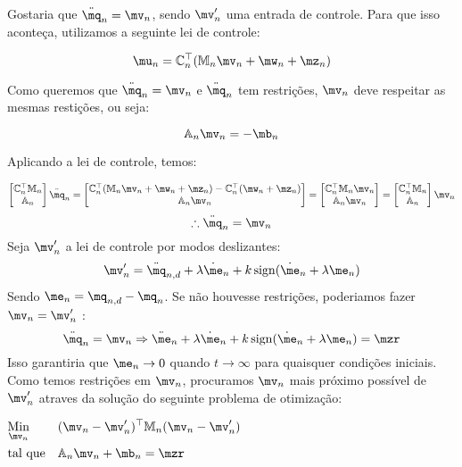 Gostaria que $ \ddot{\mq}_n = \mv_n $, sendo $\mv'_n$ uma entrada de controle. Para que isso aconte\c{c}a, utilizamos a seguinte lei de controle:

$$ \mu_n = \mC_n^\top ( \mM_n \mv_n + \mw_n + \mz_n ) $$

Como queremos que $ \ddot{\mq}_n = \mv_n $ e $\ddot{\mq}_n$ tem restri\c{c}\~oes, $\mv_n$ deve respeitar as mesmas resti\c{c}\~oes, ou seja:

$$ \mA_n \mv_n = -\mb_n $$

Aplicando a lei de controle, temos:

$$
\begin{bmatrix}
\mC_n^\top \mM_n \\
\mA_n
\end{bmatrix}
\ddot{\mq}_n
=
\begin{bmatrix}
\mC_n^\top ( \mM_n \mv_n + \mw_n + \mz_n ) - \mC_n^\top(\mw_n + \mz_n) \\
\mA_n \mv_n
\end{bmatrix}
=
\begin{bmatrix}
\mC_n^\top  \mM_n \mv_n \\
\mA_n \mv_n
\end{bmatrix}
=
\begin{bmatrix}
\mC_n^\top \mM_n \\
\mA_n
\end{bmatrix}
\mv_n
$$
$$
\therefore \ddot{\mq}_n = \mv_n
$$
Seja $\mv'_n$ a lei de controle por modos deslizantes:
$$ \mv'_n = \ddot{\mq}_{n, d} + \lambda \dot{\me}_n + k \sign (\dot{\me}_n + \lambda \me_n) $$
Sendo $ \me_n = \mq_{n,d} - \mq_n $. Se n\~ao houvesse restri\c{c}\~oes, poderiamos fazer $ \mv_n = \mv'_n $ :
$$ \ddot{\mq}_n = \mv_n \Rightarrow  \ddot{\me}_n + \lambda \dot{\me}_n + k \sign (\dot{\me}_n + \lambda \me_n) = \mzr$$
Isso garantiria que $\me_n \rightarrow 0$ quando $t \rightarrow \infty$ para quaisquer condi\c{c}\~oes iniciais. \\

Como temos restri\c{c}\~oes em $\mv_n$, procuramos $\mv_n$ mais pr\'oximo poss\'ivel de $\mv'_n$ atraves da solu\c{c}\~ao do seguinte problema de otimiza\c{c}\~ao:

\begin{center}
$\begin{aligned}
& \underset{\mv_n}{\text{Min}}
& & (\mv_n - \mv'_n)^\top \mM_n (\mv_n - \mv'_n) \\
& \text{tal que}
& & \mA_n \mv_n + \mb_n = \mzr
\end{aligned}$
\end{center}

